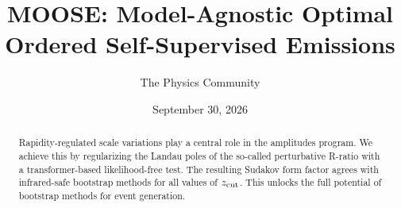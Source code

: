 \documentclass[11pt]{article}
\title{MOOSE: Model-Agnostic Optimal Ordered Self-Supervised Emissions}
\author{The Physics Community}
\date{September 30, 2026}
\numberwithin{equation}{section}
\theoremstyle{definition}
\theoremstyle{remark}
\begin{document}
\maketitle
\begin{abstract}
Rapidity-regulated scale variations play a central role in the
amplitudes program. We achieve this by regularizing the Landau poles of
the so-called perturbative R-ratio with a transformer-based
likelihood-free test. The resulting Sudakov form factor agrees with
infrared-safe bootstrap methods for all values of $z_{\rm cut}$. This
unlocks the full potential of bootstrap methods for event generation.
\end{abstract}
\tableofcontents




\nocite{*}


\end{document}
